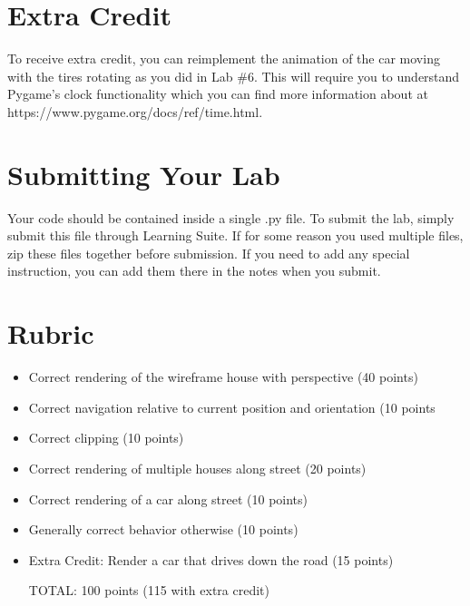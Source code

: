 \documentclass[11pt]{article}
\begin{document}
\divider

\section*{Extra Credit}

To receive extra credit, you can reimplement the animation of the car moving with the tires rotating as you did in Lab \#6. This will require you to understand Pygame's clock functionality which you can find more information about at https://www.pygame.org/docs/ref/time.html.

\divider

\section*{Submitting Your Lab}

Your code should be contained inside a single .py file. To submit the lab, simply submit this file through Learning Suite. If for some reason you used multiple files, zip these files together before submission. If you need to add any special instruction, you can add them there in the notes when you submit.

\divider

\section*{Rubric}

\begin{itemize}
	\item	Correct rendering of the wireframe house with perspective (40 points)
    \item   Correct navigation relative to current position and orientation (10 points
    \item   Correct clipping (10 points)
    \item   Correct rendering of multiple houses along street (20 points)
    \item   Correct rendering of a car along street (10 points)
    \item   Generally correct behavior otherwise (10 points)
    \item   Extra Credit: Render a car that drives down the road (15 points)	

TOTAL: 100 points  (115 with extra credit)

\end{itemize}

\end{document}

